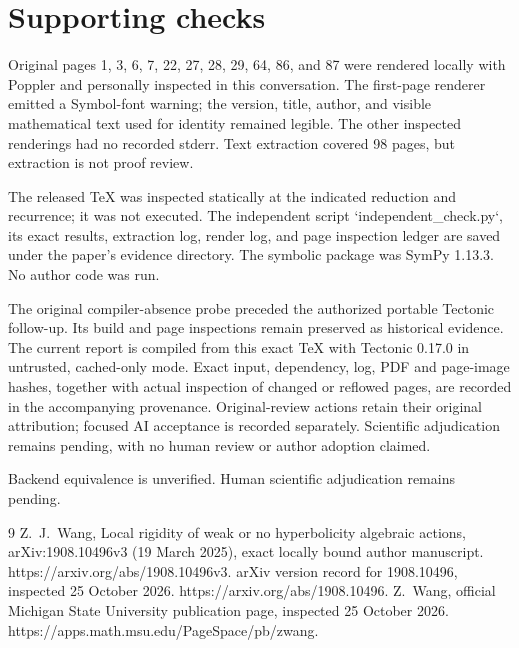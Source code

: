 \documentclass[10pt]{article}
\begin{document}
\section*{Supporting checks}
Original pages 1, 3, 6, 7, 22, 27, 28, 29, 64, 86, and 87 were rendered locally with Poppler and personally inspected in this conversation. The first-page renderer emitted a Symbol-font warning; the version, title, author, and visible mathematical text used for identity remained legible. The other inspected renderings had no recorded stderr. Text extraction covered 98 pages, but extraction is not proof review.\par
The released TeX was inspected statically at the indicated reduction and recurrence; it was not executed. The independent script `independent\_check.py`, its exact results, extraction log, render log, and page inspection ledger are saved under the paper’s evidence directory. The symbolic package was SymPy 1.13.3. No author code was run.\par
The original compiler-absence probe preceded the authorized portable Tectonic follow-up. Its build and page inspections remain preserved as historical evidence. The current report is compiled from this exact TeX with Tectonic 0.17.0 in untrusted, cached-only mode. Exact input, dependency, log, PDF and page-image hashes, together with actual inspection of changed or reflowed pages, are recorded in the accompanying provenance. Original-review actions retain their original attribution; focused AI acceptance is recorded separately. Scientific adjudication remains pending, with no human review or author adoption claimed.\par
Backend equivalence is unverified. Human scientific adjudication remains pending.\par
9 Z. J. Wang, Local rigidity of weak or no hyperbolicity algebraic actions, arXiv:1908.10496v3 (19 March 2025), exact locally bound author manuscript. https://arxiv.org/abs/1908.10496v3. arXiv version record for 1908.10496, inspected 25 October 2026. https://arxiv.org/abs/1908.10496. Z. Wang, official Michigan State University publication page, inspected 25 October 2026. https://apps.math.msu.edu/PageSpace/pb/zwang.\par
\end{document}
